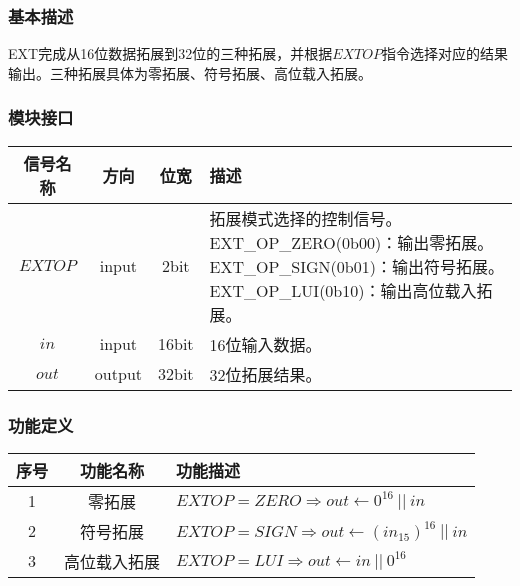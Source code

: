 \documentclass[main.tex]{subfiles}
\begin{document}
\subsubsection{基本描述}
EXT完成从16位数据拓展到32位的三种拓展，并根据$EXTOP$指令选择对应的结果输出。三种拓展具体为零拓展、符号拓展、高位载入拓展。

\subsubsection{模块接口}
\begin{center}
    \begin{tabular}[]{c c c l}
        \toprule
        信号名称 & 方向 & 位宽 & 描述 \\
        \midrule
        $EXTOP$ & input & 2bit & \makecell[lt]{
            拓展模式选择的控制信号。\\
            EXT\_OP\_ZERO(0b00)：输出零拓展。 \\
            EXT\_OP\_SIGN(0b01)：输出符号拓展。 \\
            EXT\_OP\_LUI(0b10)：输出高位载入拓展。 \\
        } \\
        \midrule
        $in$ & input & 16bit & 16位输入数据。\\
        $out$ & output & 32bit & 32位拓展结果。 \\
        \bottomrule
    \end{tabular}
\end{center}

\subsubsection{功能定义}
\begin{center}
    \begin{tabular}{c c l}
        \toprule
        序号 & 功能名称 & 功能描述 \\
        \midrule
        1 & 零拓展 & $EXTOP = ZERO \Rightarrow out \leftarrow 0^{16}\ ||\ in$ \\
        2 & 符号拓展 & $EXTOP = SIGN \Rightarrow out \leftarrow \left(in_{15}\right)^{16}\ ||\ in$ \\
        3 & 高位载入拓展 & $EXTOP = LUI \Rightarrow out \leftarrow in\ ||\ 0^{16}$\\
        \bottomrule
    \end{tabular}
\end{center}
\end{document}
